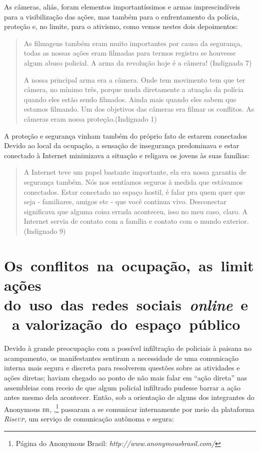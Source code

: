 As câmeras, aliás, foram elementos importantíssimos e armas
imprescindíveis para a visibilização das ações, mas também para o
enfrentamento da polícia, proteção e, no limite, para o ativismo, como
vemos nestes dois depoimentos:

\begin{quote}
As filmagens também eram muito importantes por causa da segurança, todas
as nossas ações eram filmadas para termos registro se houvesse algum
abuso policial. A arma da revolução hoje é a câmera! (Indignada 7)

A nossa principal arma era a câmera. Onde tem movimento tem que ter
câmera, no mínimo três, porque muda diretamente a atuação da polícia
quando eles estão sendo filmados. Ainda mais quando eles sabem que
estamos filmando. Um dos objetivos das câmeras era filmar os conflitos.
As câmeras eram nossa proteção.(Indignado 1)
\end{quote}

A proteção e segurança vinham também do próprio fato de estarem
conectados Devido ao local da ocupação, a sensação de insegurança
predominava e estar conectado à Internet minimizava a situação e
religava os jovens às suas famílias:

\begin{quote}
A Internet teve um papel bastante importante, ela era nossa garantia de
segurança também. Nós nos sentíamos seguros à medida que estávamos
conectados. Estar conectado no espaço hostil, é falar pra quem quer que
seja - familiares, amigos etc - que você continua vivo. Desconectar
significava que alguma coisa errada aconteceu, isso no meu caso, claro.
A Internet servia de contato com a família e contato com o mundo
exterior. (Indignado 9)
\end{quote}

\section{Os~conflitos~na~ocupação,~as~limitações do~uso~das~redes~sociais~\emph{\emph{online}}~e~a valorização~do~espaço~público}

\noindent{}Devido à grande preocupação com a possível infiltração de policiais à
paisana no acampamento, os manifestantes sentiram a necessidade de
uma comunicação interna mais segura e discreta para resolverem questões
sobre as atividades e ações diretas; haviam chegado ao ponto de não mais
falar em ``ação direta'' nas assembleias com receio de que algum
policial infiltrado pudesse barrar a ação antes mesmo dela acontecer.
Então, sob a orientação de alguns dos integrantes do Anonymous \textsc{br},
,\footnote{Página do Anonymous Brasil:
  \emph{http://www.anonymousbrasil.com/}} passaram a se comunicar
internamente por meio da plataforma \emph{Rise\textsc{up},} um serviço de
comunicação autônoma e segura:

